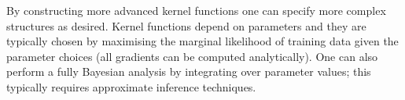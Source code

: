 \documentclass[preprint,authoryear,12pt]{elsarticle}
\begin{document}
By constructing more advanced kernel functions one can specify more complex structures as desired.
Kernel functions depend on parameters and they are typically chosen by maximising the marginal likelihood of training data given the parameter choices (all gradients can be computed analytically).
One can also perform a fully Bayesian analysis by integrating over parameter values; this typically requires approximate inference techniques.




\end{document}
